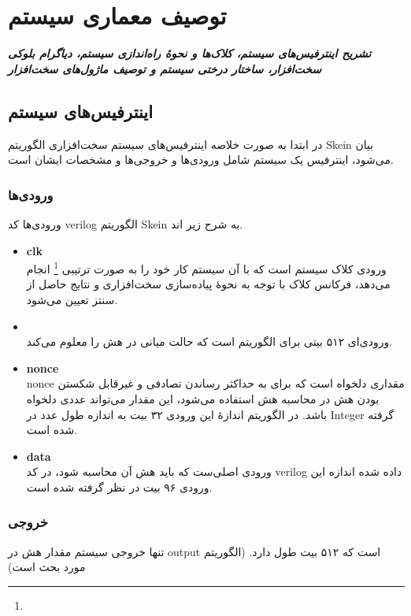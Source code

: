 \chapter{توصیف معماری سیستم}
\noindent
\textbf{
	\textit{
		تشریح اینترفیس‌های سیستم، کلاک‌ها و نحوهٔ راه‌اندازی سیستم، دیاگرام بلوکی سخت‌افزار، ساختار درختی سیستم و توصیف ماژول‌های سخت‌افزار 
	}
}
\pagebreak

\section{ اینترفیس‌های سیستم}
در ابتدا به صورت خلاصه اینترفیس‌های سیستم سخت‌افزاری الگوریتم Skein بیان می‌شود، اینترفیس یک سیستم شامل ورودی‌ها و خروجی‌ها و مشخصات ایشان است. 
\subsection{ورودی‌ها}
ورودی‌ها کد verilog الگوریتم Skein به شرح زیر اند.
\begin{itemize}
	\item
	      \textbf{clk}\\
	      ورودی کلاک سیستم است که با آن سیستم کار خود را به صورت ترتیبی 
	      \footnote{}
	      انجام می‌دهد، فرکانس کلاک با توجه به نحوهٔ پیاده‌سازی سخت‌افزاری و نتایج حاصل از سنتز تعیین می‌شود.
	\item
	      \textbf{}\\
	      ورودی‌ای ۵۱۲ بیتی برای الگوریتم
	      است که حالت میانی در هش را معلوم می‌کند.
	\item
	      \textbf{nonce}\\
	      nonce مقداری دلخواه است که برای به حداکثر رساندن تصادفی  و غیرقابل شکستن بودن هش 
	      در محاسبه هش استفاده می‌شود، این مقدار می‌تواند عددی دلخواه باشد. در الگوریتم 
	      اندازهٔ این ورودی ۳۲ بیت به اندازه طول عدد در Integer گرفته شده است.
	\item
	      \textbf{data}\\
	      ورودی اصلی‌ست که باید هش آن محاسبه شود، در کد verilog داده شده اندازه این ورودی ۹۶ بیت در نظر گرفته شده است. 
\end{itemize}

\subsection{خروجی}
تنها خروجی سیستم مقدار هش در output است که ۵۱۲ بیت طول دارد.
(الگوریتم مورد بحث 
است)

